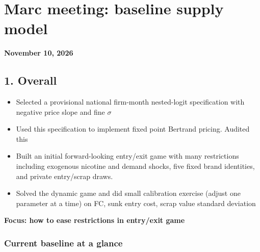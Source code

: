 \documentclass[11pt,]{article}
\date{}
\providecommand{\tightlist}{%
  \setlength{\itemsep}{0pt}\setlength{\parskip}{0pt}}
\begin{document}
\section{Marc meeting: baseline supply
model}\label{marc-meeting-baseline-supply-model}

\textbf{November 10, 2026}

\subsection{1. Overall}\label{overall}

\begin{itemize}
\tightlist
\item
  Selected a provisional national firm-month nested-logit specification
  with negative price slope and fine \(\sigma\)
\item
  Used this specification to implement fixed point Bertrand pricing.
  Audited this
\item
  Built an initial forward-looking entry/exit game with many
  restrictions including exogenous nicotine and demand shocks, five
  fixed brand identities, and private entry/scrap draws.
\item
  Solved the dynamic game and did small calibration exercise (adjust one
  parameter at a time) on FC, sunk entry cost, scrap value standard
  deviation
\end{itemize}

\textbf{Focus: how to ease restrictions in entry/exit game}

\subsubsection{Current baseline at a
glance}\label{current-baseline-at-a-glance}
\end{document}
